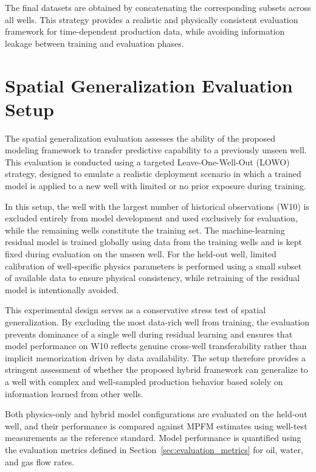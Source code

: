 \documentclass[12pt,APA]{uomthesis}
\begin{document}
The final datasets are obtained by concatenating the corresponding subsets across all wells. This strategy provides a realistic and physically consistent evaluation framework for time-dependent production data, while avoiding information leakage between training and evaluation phases.

\section{Spatial Generalization Evaluation Setup}
\label{sec:lowo_setup}
The spatial generalization evaluation assesses the ability of the proposed modeling framework to transfer predictive capability to a previously unseen well. 
This evaluation is conducted using a targeted Leave-One-Well-Out (LOWO) strategy, designed to emulate a realistic deployment scenario in which a trained model is applied to a new well with limited or no prior exposure during training.

In this setup, the well with the largest number of historical observations (W10) is excluded entirely from model development and used exclusively for evaluation, while the remaining wells constitute the training set. The machine-learning residual model is trained globally using data from the training wells and is kept fixed during evaluation on the unseen well. For the held-out well, limited calibration of well-specific physics parameters is performed using a small subset of available data to ensure physical consistency, while retraining of the residual model is intentionally avoided.

This experimental design serves as a conservative stress test of spatial generalization. By excluding the most data-rich well from training, the evaluation prevents dominance of a single well during residual learning and ensures that model performance on W10 reflects genuine cross-well transferability rather than implicit memorization driven by data availability. The setup therefore provides a stringent assessment of whether the proposed hybrid framework can generalize to a well with complex and well-sampled production behavior based solely on information learned from other wells.

Both physics-only and hybrid model configurations are evaluated on the held-out well, and their performance is compared against MPFM estimates using well-test measurements as the reference standard. Model performance is quantified using the evaluation metrics defined in Section~\ref{sec:evaluation_metrics} for oil, water, and gas flow rates.
\end{document}
